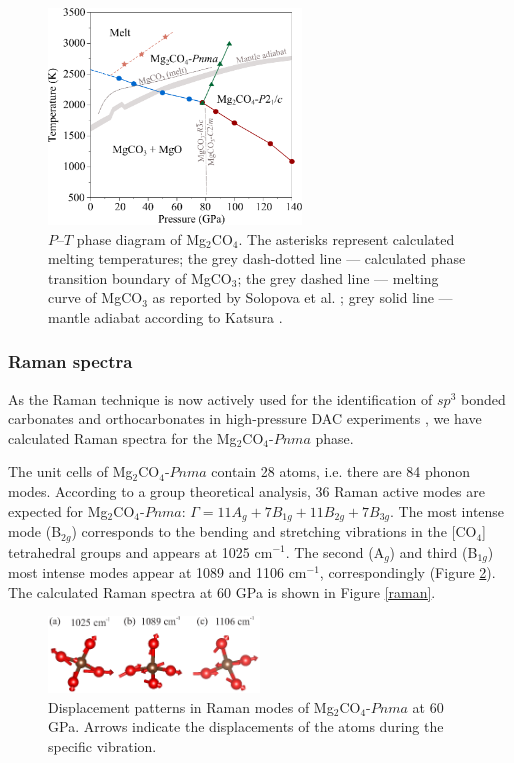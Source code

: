 \documentclass[a4paperm]{article}
\begin{document}
\begin{figure}[H]
	\centering
	\includegraphics[width=0.6\textwidth]{phdia_mg2co4}
	\caption{$P$--$T$ phase diagram of Mg$_2$CO$_4$. The asterisks represent calculated melting temperatures;  the grey dash-dotted line --- calculated phase transition boundary of MgCO$_3$; the grey dashed line --- melting curve of MgCO$_3$ as reported by Solopova et al. \cite{solopova2015}; grey solid line --- mantle adiabat according to Katsura \cite{katsura2010}.} 
\label{phdia}
\end{figure}


\subsubsection*{Raman spectra}

{\color{blue}
As the Raman technique is now actively used for the identification of $sp^3$ bonded carbonates and orthocarbonates in high-pressure DAC experiments \cite{lobanov2017, binck2020_mgco3}, we have calculated Raman spectra for the Mg$_2$CO$_4$-$Pnma$ phase.

The unit cells of Mg$_2$CO$_4$-$Pnma$ contain 28 atoms, i.e. there are 84 phonon modes. 
According to a group theoretical analysis, 36 Raman active modes are expected for Mg$_2$CO$_4$-$Pnma$: $\Gamma = 11A_g + 7B_{1g} + 11B_{2g} + 7B_{3g}$. 
The most intense mode (B$_{2g}$) corresponds to the bending and stretching vibrations in the [CO$_4$] tetrahedral groups and appears at 1025 cm$^{-1}$. 
The second (A$_g$) and third (B$_{1g}$) most intense modes appear at 1089 and 1106 cm$^{-1}$, correspondingly (Figure \ref{displ}). The calculated Raman spectra at 60 GPa is shown in Figure \ref{raman}.
}

\begin{figure}[H]
	\includegraphics[width=0.5\textwidth]{dis_pat} \centering
	\caption{
		{\color{blue}
		Displacement patterns in Raman modes of Mg$_2$CO$_4$-$Pnma$ at 60 GPa. Arrows indicate the displacements of the atoms during the specific vibration.
		}	
			} \label{displ}
\end{figure}
\end{document}
